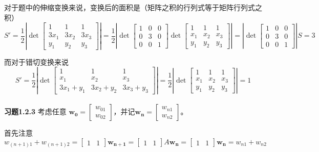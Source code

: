 	对于题中的伸缩变换来说，变换后的面积是（矩阵之积的行列式等于矩阵行列式之积）
	\[
		S'=\frac{1}{2}\left|\det\begin{bmatrix}
			1&1&1\\
			3x_1&3x_2&3x_3\\
			y_1&y_2&y_3
		\end{bmatrix}\right|=\frac{1}{2}\left|\det\begin{bmatrix}
			1&0&0\\
			0&3&0\\
			0&0&1
		\end{bmatrix}\det\begin{bmatrix}
		1&1&1\\
		x_1&x_2&x_3\\
		y_1&y_2&y_3
		\end{bmatrix}\right|=\left|\det\begin{bmatrix}
		1&0&0\\
		0&3&0\\
		0&0&1
		\end{bmatrix}\right|S=3
	\]
	
	而对于错切变换来说
	\[
		S'=\frac{1}{2}\left|\det\begin{bmatrix}
			1&1&1\\
			x_1&x_2&x_3\\
			3x_1+y_1&3x_2+y_2&3x_3+y_3
		\end{bmatrix}\right|=\frac{1}{2}\left|\det\begin{bmatrix}
		1&1&1\\
		x_1&x_2&x_3\\
		y_1&y_2&y_3
		\end{bmatrix}\right|=1
	\]
	\quad\\[1em]
	
	\textbf{习题1.2.3} 考虑任意 $\boldsymbol{w_0}=\begin{bmatrix}
		w_{01}\\w_{02}
	\end{bmatrix}$，并记$\boldsymbol{w_n}=\begin{bmatrix}
		w_{n1}\\w_{n2}
	\end{bmatrix}$。
	
	首先注意
	\[
		w_{(n+1)1}+w_{(n+1)2}=\begin{bmatrix}
			1&1
		\end{bmatrix}\boldsymbol{w_{n+1}}=\begin{bmatrix}
		1&1
		\end{bmatrix}A\boldsymbol{w_{n}}=\begin{bmatrix}
		1&1
		\end{bmatrix}\boldsymbol{w_{n}}=w_{n1}+w_{n2}
	\]
	
